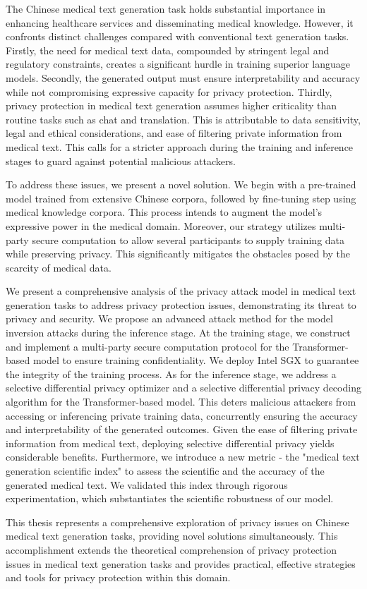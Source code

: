 \begin{abstract*}
The Chinese medical text generation task holds substantial importance in enhancing healthcare services and disseminating medical knowledge. However, it confronts distinct challenges compared with conventional text generation tasks. Firstly, the need for medical text data, compounded by stringent legal and regulatory constraints, creates a significant hurdle in training superior language models. Secondly, the generated output must ensure interpretability and accuracy while not compromising expressive capacity for privacy protection. Thirdly, privacy protection in medical text generation assumes higher criticality than routine tasks such as chat and translation. This is attributable to data sensitivity, legal and ethical considerations, and ease of filtering private information from medical text. This calls for a stricter approach during the training and inference stages to guard against potential malicious attackers.

To address these issues, we present a novel solution. We begin with a pre-trained model trained from extensive Chinese corpora, followed by fine-tuning step using medical knowledge corpora. This process intends to augment the model's expressive power in the medical domain. Moreover, our strategy utilizes multi-party secure computation to allow several participants to supply training data while preserving privacy. This significantly mitigates the obstacles posed by the scarcity of medical data.

We present a comprehensive analysis of the privacy attack model in medical text generation tasks to address privacy protection issues, demonstrating its threat to privacy and security. We propose an advanced attack method for the model inversion attacks during the inference stage. At the training stage, we construct and implement a multi-party secure computation protocol for the Transformer-based model to ensure training confidentiality. We deploy Intel SGX to guarantee the integrity of the training process. As for the inference stage, we address a selective differential privacy optimizer and a selective differential privacy decoding algorithm for the Transformer-based model. This deters malicious attackers from accessing or inferencing private training data, concurrently ensuring the accuracy and interpretability of the generated outcomes. Given the ease of filtering private information from medical text, deploying selective differential privacy yields considerable benefits. Furthermore, we introduce a new metric - the "medical text generation scientific index" to assess the scientific and the accuracy of the generated medical text. We validated this index through rigorous experimentation, which substantiates the scientific robustness of our model. 

This thesis represents a comprehensive exploration of privacy issues on Chinese medical text generation tasks, providing novel solutions simultaneously. This accomplishment extends the theoretical comprehension of privacy protection issues in medical text generation tasks and provides practical, effective strategies and tools for privacy protection within this domain.

  
\end{abstract*}
